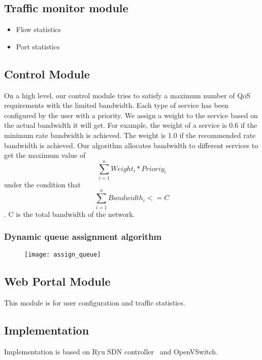 \subsection{Traffic monitor module}



\begin{itemize}
\item Flow statistics
\item Port statistics
\end{itemize}
\subsection{Control Module}
On a high level, our control module tries to satisfy a maximum number of QoS requirements with the limited bandwidth.
Each type of service has been configured by the user with a priority. We assign a weight to the service based on the actual bandwidth it will get. For example, the weight of a service is 0.6 if the minimum rate bandwidth is achieved. The weight is 1.0 if the recommended rate bandwidth is achieved.
Our algorithm allocates bandwidth to different services to get the maximum value of $$\sum_{i=1}^{n} Weight_i*Prioriy_i $$ under the condition that
$$\sum_{i=1}^{n} Bandwidth_i <= C $$. C is the total bandwidth of the network.


\subsubsection{Dynamic queue assignment algorithm}

\begin{figure}[htb]
\centering
\texttt{[image: assign\_queue]}
\caption{}
\label{fig:assign_queue}
\end{figure}

\subsection{Web Portal Module}
This module is for user configuration and traffic statistics.


\subsection{Implementation}
Implementation is based on Ryu SDN controller~\cite{ryu} and OpenVSwitch.
